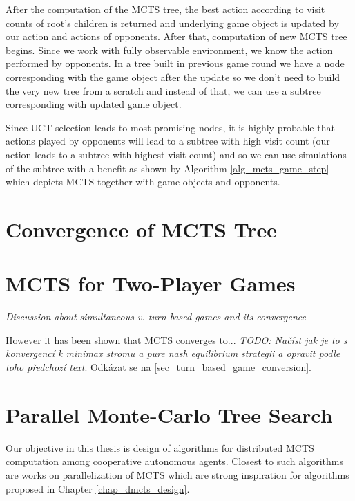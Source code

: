 After the computation of the MCTS tree, the best action according to visit counts of root's
children is returned and underlying game object is updated by our action and actions of
opponents. After that, computation of new MCTS tree begins. Since we work with fully observable
environment, we know the action performed by opponents. In a tree built in previous game round
we have a node corresponding with the game object after the update so we don't need to build
the very new tree from a scratch and instead of that, we can use a subtree corresponding with
updated game object. 

Since UCT selection leads to most promising nodes, it is highly probable
that actions played by opponents will lead to a subtree with high visit count (our action leads
to a subtree with highest visit count) and so we can use simulations of the subtree with a
benefit as shown by Algorithm \ref{alg_mcts_game_step} which depicts MCTS together with game
objects and opponents.


\section{Convergence of MCTS Tree}
\label{sec_minimax_convergence}



\section{MCTS for Two-Player Games}
\label{sec_two_players_mcts}
\emph{Discussion about simultaneous v. turn-based games and its convergence}


However it has been shown that MCTS converges to... \emph{TODO: Načíst jak je to s konvergencí k
minimax stromu a pure nash equilibrium strategii a opravit podle toho předchozí text}. Odkázat se
na \ref{sec_turn_based_game_conversion}.




\section{Parallel Monte-Carlo Tree Search}
\label{sec_parallel_mcts}

Our objective in this thesis is design of algorithms for distributed MCTS computation among
cooperative autonomous agents. Closest to such algorithms are works on parallelization of MCTS 
which are
strong inspiration for algorithms proposed in Chapter \ref{chap_dmcts_design}.

